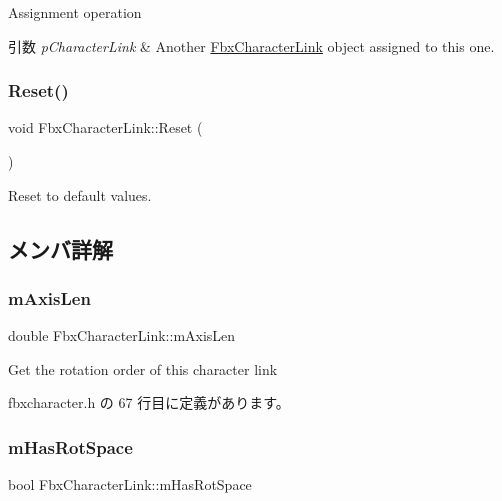 Assignment operation 
\begin{DoxyParams}{引数}
{\em p\+Character\+Link} & Another \hyperlink{class_fbx_character_link}{Fbx\+Character\+Link} object assigned to this one. \\
\hline
\end{DoxyParams}
\mbox{\label{class_fbx_character_link_a9d0e6c6b7fc03ccb93283d79f763403f}} 
\subsubsection{\texorpdfstring{Reset()}{Reset()}}
{\footnotesize\ttfamily void Fbx\+Character\+Link\+::\+Reset (\begin{DoxyParamCaption}{ }\end{DoxyParamCaption})}

Reset to default values. 

\subsection{メンバ詳解}
\mbox{\label{class_fbx_character_link_a9d523e0ad398dcbab03548d725ed7d4e}} 
\subsubsection{\texorpdfstring{m\+Axis\+Len}{mAxisLen}}
{\footnotesize\ttfamily double Fbx\+Character\+Link\+::m\+Axis\+Len}



Get the rotation order of this character link 



 fbxcharacter.\+h の 67 行目に定義があります。

\mbox{\label{class_fbx_character_link_a013df32c72b266e1b0c23ed6e88d6723}} 
\subsubsection{\texorpdfstring{m\+Has\+Rot\+Space}{mHasRotSpace}}
{\footnotesize\ttfamily bool Fbx\+Character\+Link\+::m\+Has\+Rot\+Space}




